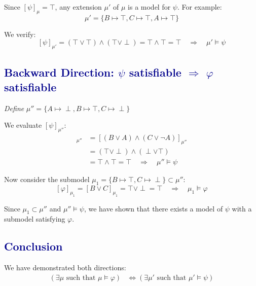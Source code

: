 \documentclass[12pt]{article}
\theoremstyle{definition}
\theoremstyle{plain}
\begin{document}
\vspace{0.3cm}
\noindent
Since $[\psi]_\mu = \top$, any extension $\mu'$ of $\mu$ is a model for $\psi$. For example:
\[
\mu' = \{B \mapsto \top, C \mapsto \top, A \mapsto \top\}
\]

\vspace{0.2cm}
\noindent
We verify:
\[
[\psi]_{\mu'} = (\top \vee \top) \wedge (\top \vee \perp) = \top \wedge \top = \top \quad \Rightarrow \quad \mu' \models \psi
\]

\subsection*{\textcolor{darkblue}{Backward Direction: $\psi$ satisfiable $\Rightarrow$ $\varphi$ satisfiable}}

\vspace{0.5cm}
\begin{tcolorbox}[colback=lightgray, colframe=darkblue, boxrule=1pt]
\textit{Define} $\mu'' = \{A \mapsto \perp, B \mapsto \top, C \mapsto \perp\}$
\end{tcolorbox}

\vspace{0.3cm}
\noindent
We evaluate $[\psi]_{\mu''}$:
\begin{align*}
[\psi]_{\mu''} &= [(B \vee A) \wedge (C \vee \neg A)]_{\mu''} \\
&= (\top \vee \perp) \wedge (\perp \vee \top) \\
&= \top \wedge \top = \top \quad \Rightarrow \quad \mu'' \models \psi
\end{align*}

\vspace{0.3cm}
\noindent
Now consider the submodel $\mu_1 = \{B \mapsto \top, C \mapsto \perp\} \subset \mu''$:
\[
[\varphi]_{\mu_1} = [B \vee C]_{\mu_1} = \top \vee \perp = \top \quad \Rightarrow \quad \mu_1 \models \varphi
\]

\vspace{0.3cm}
\noindent
Since $\mu_1 \subset \mu''$ and $\mu'' \models \psi$, we have shown that there exists a model of $\psi$ with a submodel satisfying $\varphi$.

\subsection*{\textcolor{darkblue}{Conclusion}}

\vspace{0.5cm}
We have demonstrated both directions:
\[
\boxed{\begin{aligned}
(\exists \mu \text{ such that } \mu \models \varphi) &\Longleftrightarrow (\exists \mu' \text{ such that } \mu' \models \psi)
\end{aligned}}
\]
\end{document}
